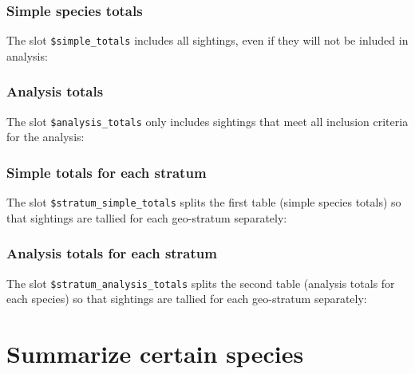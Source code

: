 \documentclass[
]{book}
\begin{document}
\hypertarget{simple-species-totals}{%
\subsubsection*{Simple species totals}\label{simple-species-totals}}

The slot \texttt{\$simple\_totals} includes all sightings, even if they will not be inluded in analysis:

\hypertarget{analysis-totals}{%
\subsubsection*{Analysis totals}\label{analysis-totals}}

The slot \texttt{\$analysis\_totals} only includes sightings that meet all inclusion criteria for the analysis:

\hypertarget{simple-totals-for-each-stratum}{%
\subsubsection*{Simple totals for each stratum}\label{simple-totals-for-each-stratum}}

The slot \texttt{\$stratum\_simple\_totals} splits the first table (simple species totals) so that sightings are tallied for each geo-stratum separately:

\hypertarget{analysis-totals-for-each-stratum}{%
\subsubsection*{Analysis totals for each stratum}\label{analysis-totals-for-each-stratum}}

The slot \texttt{\$stratum\_analysis\_totals} splits the second table (analysis totals for each species) so that sightings are tallied for each geo-stratum separately:

\hypertarget{summarize-certain-species}{%
\section*{Summarize certain species}\label{summarize-certain-species}}
\end{document}
